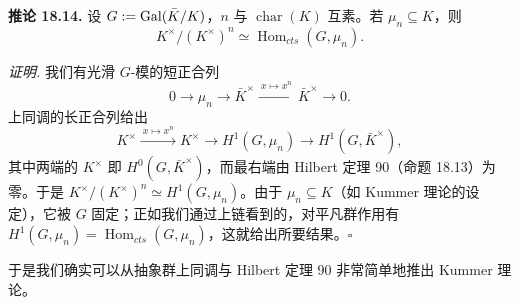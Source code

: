 \textbf{推论 18.14.} 设 $G:=\operatorname{Gal}(\bar K/K)$，$n$ 与 $\operatorname{char}(K)$ 互素。若 $\mu_n\subseteq K$，则
\[
K^\times/(K^\times)^n\simeq \operatorname{Hom}_{cts}(G,\mu_n).
\]

\textit{证明.} 我们有光滑 $G$-模的短正合列
\[
0\to \mu_n\to \bar K^\times\xrightarrow{\ x\mapsto x^n\ }\bar K^\times\to 0.
\]
上同调的长正合列给出
\[
K^\times\xrightarrow{\ x\mapsto x^n\ }K^\times\to H^1(G,\mu_n)\to H^1(G,\bar K^\times),
\]
其中两端的 $K^\times$ 即 $H^0(G,\bar K^\times)$，而最右端由 Hilbert 定理 90（命题 18.13）为零。于是 $K^\times/(K^\times)^n\simeq H^1(G,\mu_n)$。由于 $\mu_n\subseteq K$（如 Kummer 理论的设定），它被 $G$ 固定；正如我们通过上链看到的，对平凡群作用有 $H^1(G,\mu_n)=\operatorname{Hom}_{cts}(G,\mu_n)$，这就给出所要结果。\hfill$\square$

于是我们确实可以从抽象群上同调与 Hilbert 定理 90 非常简单地推出 Kummer 理论。
